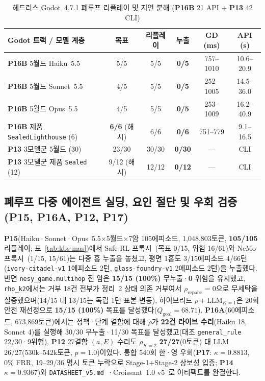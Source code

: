 \begin{table}[!tbp]
\caption{헤드리스 Godot~4.7.1 폐루프 리플레이 및 지연 분해 (\textbf{P16B} 21 API + \textbf{P13} 42 CLI)}
\label{tab:tog-godot}
\centering
\scriptsize
\setlength{\tabcolsep}{2.2pt}
\begin{tabularx}{\columnwidth}{@{}>{\raggedright\arraybackslash}X*{5}{c}@{}}
\toprule
\textbf{Godot 트랙 / 모델 계층} & \textbf{목표} & \textbf{리플레이} & \textbf{누출} & \textbf{GD (ms)} & \textbf{API (s)} \\
\midrule
\textbf{P16B} 5월드 Haiku~5.5 & 5/5 & 5/5 & \textbf{0/5} & 757--1010 & 10.6--20.9 \\
\textbf{P16B} 5월드 Sonnet~5.5 & 4/5 & 5/5 & \textbf{0/5} & 252--1005 & 14.5--36.0 \\
\textbf{P16B} 5월드 Opus~5.5 & 4/5 & 5/5 & \textbf{0/5} & 253--1009 & 16.2--40.9 \\
\textbf{P16B} 제품 \texttt{SealedLighthouse} (6) & \textbf{6/6} (해시) & 6/6 & \textbf{0/6} & 751--779 & 9.1--16.5 \\
\textbf{P13} 3모델군 5월드 (30) & 23/30 & 30/30 & \textbf{0/30} & --- & CLI \\
\textbf{P13} 3모델군 제품 \texttt{Sealed} (12) & 9/12 (해시) & 12/12 & \textbf{0/12} & --- & CLI \\
\bottomrule
\end{tabularx}
\end{table}

\subsection{폐루프 다중 에이전트 실딩, 요인 절단 및 우회 검증 (\textbf{P15}, \textbf{P16A}, \textbf{P12}, \textbf{P17})}
\textbf{P15}(Haiku·Sonnet·Opus~5.5$\times$5월드$\times$7암 105에피소드, 1,048,803토큰, \textbf{105/105} 리플레이; 표~\ref{tab:kbs-mas})에서 Safe-RL 프록시~\cite{alshiekh2018shield}(목표 0/15, 위험 16/61)와 NeMo 프록시~\cite{rebedea2023nemo}(1/15, 15/61)는 다중 홉 누출을 놓쳤고, 평면 1홉도 3/15에피소드 4/66턴(\texttt{ivory-citadel-v1} 1에피소드 2턴, \texttt{glass-foundry-v1} 2에피소드 2턴)을 누출했다. 반면 \texttt{nesy\_game.multihop} 전 암은 \textbf{15/15 (100\%)} 무누출·\textbf{0} 위험을 유지했고, \texttt{rho\_k2}에서는 거부 18건 전부가 정리~2 상태 의존 거부여서 $\rho_{\mathrm{repairs}}{=}0$으로 무세탁을 실증했으며(14/15 대 13/15는 독립 1턴 표본 변동), 하이브리드 $\rho{+}\text{LLM}_{K=1}$은 20회 안전 재선정으로 \textbf{15/15 (100\%)} 목표를 달성했다($Q_{\mathrm{goal}}{=}68.71$). \textbf{P16A}(60에피소드, 673,869토큰)에서는 정책·단계 결함에 대해 $\rho$가 \textbf{22건 라이브 수리}(Haiku 18, Sonnet 4)를 실행해 30/30 무누출·11/30 목표를 달성했고(대조 \texttt{general\_rule} 22/30·9위험), \textbf{P12} 27결함 $(a,E)$ 수리도 $\rho_{K=2}$ \textbf{27/27}(0토큰) 대 LLM 26/27(530k--542k토큰, $p{=}1.0$)이었다. 통합 540회 한·영 우회(\textbf{P17}: $\kappa{=}0.8813$, 0\% FRR, 19--29/36 명시 토큰 누락으로 Stage-1+Stage-2 상보성 입증; \textbf{P14} $\kappa{=}0.9367$)와 \texttt{DATASHEET\_v5.md}~\cite{gebru2021datasheets}·Croissant~1.0 v5~\cite{akhtar2024croissant}로 아티팩트를 완결한다.

